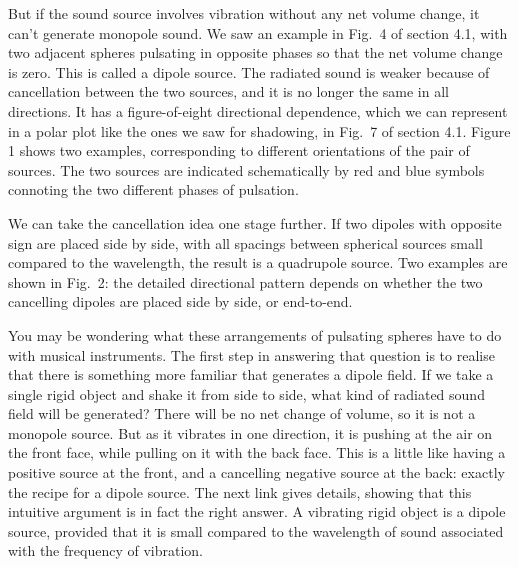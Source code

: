   But if the sound source involves vibration without any net volume change, it 
  can't generate monopole sound. We saw an example in Fig.\ 4 of section 4.1, 
  with two adjacent spheres pulsating in opposite phases so that the net volume 
  change is zero. This is called a dipole source. The radiated sound is weaker 
  because of cancellation between the two sources, and it is no longer the same 
  in all directions. It has a figure-of-eight directional dependence, which we 
  can represent in a polar plot like the ones we saw for shadowing, in Fig.\ 7 
  of section 4.1. Figure 1 shows two examples, corresponding to different 
  orientations of the pair of sources. The two sources are indicated 
  schematically by red and blue symbols connoting the two different phases of 
  pulsation. 


  We can take the cancellation idea one stage further. If two dipoles with 
  opposite sign are placed side by side, with all spacings between spherical 
  sources small compared to the wavelength, the result is a quadrupole source. 
  Two examples are shown in Fig.\ 2: the detailed directional pattern depends 
  on whether the two cancelling dipoles are placed side by side, or end-to-end. 


  You may be wondering what these arrangements of pulsating spheres have to do 
  with musical instruments. The first step in answering that question is to 
  realise that there is something more familiar that generates a dipole field. 
  If we take a single rigid object and shake it from side to side, what kind of 
  radiated sound field will be generated? There will be no net change of 
  volume, so it is not a monopole source. But as it vibrates in one direction, 
  it is pushing at the air on the front face, while pulling on it with the back 
  face. This is a little like having a positive source at the front, and a 
  cancelling negative source at the back: exactly the recipe for a dipole 
  source. The next link gives details, showing that this intuitive argument is 
  in fact the right answer. A vibrating rigid object is a dipole source, 
  provided that it is small compared to the wavelength of sound associated with 
  the frequency of vibration. 

